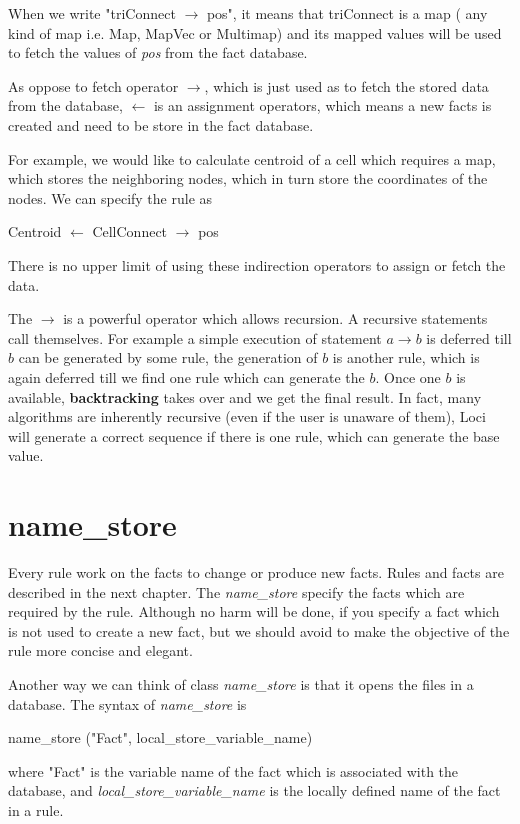 \par When we write "triConnect $\rightarrow$ pos", it means that triConnect is a map (
any kind of map i.e. Map, MapVec or Multimap) and its mapped values will be used
to fetch the values of {\em pos} from the fact database.

As oppose to fetch operator $\rightarrow$, which is just used as to fetch the 
stored data from the database, $\leftarrow$ is an assignment operators, which
means a new facts is created and need to be store in the fact database. 
\par For example, we would like to calculate centroid of a cell which 
requires a map, which stores the neighboring nodes, which in turn store the
coordinates of the nodes. We can specify the rule as
\begin{center}
Centroid $\leftarrow$ CellConnect $\rightarrow$ pos
\end{center}

There is no upper limit of using these indirection operators to assign or 
fetch the data.

The $\rightarrow$ is a powerful operator which allows recursion. A recursive
statements call themselves. For example a simple execution of statement 
$ a \rightarrow b$ is deferred till $b$ can be generated by some rule, the
generation of $b$ is another rule, which is again deferred till we find
one rule which can generate the $b$. Once one $b$ is available, {\bf backtracking}
takes over and we get the final result. In fact, many algorithms are inherently
recursive (even if the user is unaware of them), Loci will generate a correct
sequence if there is one rule, which can generate the base value.


\section {name\_store}
Every rule work on the facts to change or produce new facts. Rules and
facts are described in the next chapter. The {\em name\_store} specify the 
facts which are required by the rule. Although
no harm will be done, if you specify a fact which is not used to create
a new fact, but we should avoid to make the objective of the rule more
concise and elegant.

\par Another way we can think of class {\em name\_store} is that it opens the
files in a database. The syntax of {\em name\_store} is
\begin{center}
name\_store ("Fact", local\_store\_variable\_name)
\end{center}
where "Fact" is the variable name of the fact which is associated with the database,
and {\em local\_store\_variable\_name} is the locally defined name 
of the fact in a rule. 

